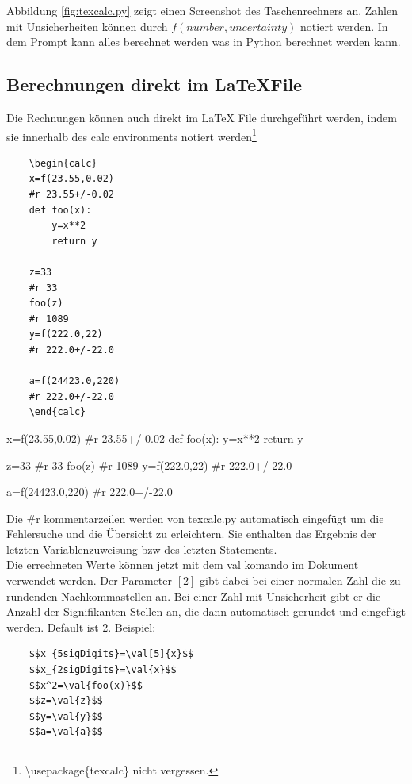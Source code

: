 \documentclass[a4paper]{article}
\begin{document}
Abbildung \ref{fig:texcalc.py} zeigt einen Screenshot des Taschenrechners an. Zahlen mit Unsicherheiten können 
durch $f(number, uncertainty)$ notiert werden. In dem Prompt kann alles berechnet werden was in Python berechnet 
werden kann. \\

\subsection{Berechnungen direkt im \LaTeX File}

Die Rechnungen können auch direkt im LaTeX File durchgeführt werden, indem sie innerhalb des calc environments 
notiert werden\footnote{\textbackslash usepackage\{texcalc\} nicht vergessen.} 

\begin{verbatim}
	\begin{calc}
	x=f(23.55,0.02)
	#r 23.55+/-0.02
	def foo(x):
		y=x**2
		return y
	
	z=33
	#r 33
	foo(z)
	#r 1089
	y=f(222.0,22)
	#r 222.0+/-22.0
	
	a=f(24423.0,220)
	#r 222.0+/-22.0
	\end{calc}
\end{verbatim}
	
\begin{calc}
x=f(23.55,0.02)
#r 23.55+/-0.02
def foo(x):
	y=x**2
	return y

z=33
#r 33
foo(z)
#r 1089
y=f(222.0,22)
#r 222.0+/-22.0

a=f(24423.0,220)
#r 222.0+/-22.0
\end{calc}

Die \#r kommentarzeilen werden von texcalc.py automatisch eingefügt um die Fehlersuche und die Übersicht zu erleichtern. 
Sie enthalten das Ergebnis der letzten Variablenzuweisung bzw des letzten Statements. \\

Die errechneten Werte können jetzt mit dem val komando im Dokument verwendet werden. Der Parameter $[2]$ gibt dabei bei 
einer normalen Zahl die zu rundenden Nachkommastellen an. Bei einer Zahl mit Unsicherheit gibt er die Anzahl der 
Signifikanten Stellen an, die dann automatisch gerundet und eingefügt werden. Default ist 2. Beispiel: \\

\begin{verbatim}
	$$x_{5sigDigits}=\val[5]{x}$$
	$$x_{2sigDigits}=\val{x}$$
	$$x^2=\val{foo(x)}$$
	$$z=\val{z}$$
	$$y=\val{y}$$
	$$a=\val{a}$$
\end{verbatim}
\end{document}
